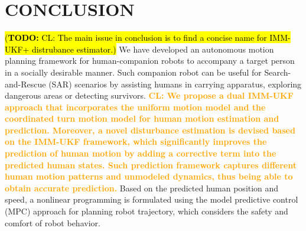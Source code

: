 \documentclass[journal]{IEEEtran}
\newcommand{\todohere}[1]{\hl{(\textbf{TODO:} #1)}}
\DeclareRobustCommand{\clnote}[1]{\ifthenelse{\boolean{include-notes}}%
	{\textcolor{orange}{\textbf{CL: #1}}}{}}
\begin{document}
	\section{CONCLUSION}\label{sec:conclusion}
	\todohere{CL: The main issue in conclusion is to find a concise name for IMM-UKF+ distrubance estimator.}
	We have developed an autonomous motion planning framework for human-companion robots to accompany a target person in a socially desirable manner.
	Such companion robot can be useful for Search-and-Rescue (SAR) scenarios by assisting humans in carrying apparatus, exploring dangerous areas or detecting survivors.
	\clnote{
		We propose a dual IMM-UKF approach that incorporates the uniform motion model and the coordinated turn motion model for human motion estimation and prediction.
		Moreover, a novel disturbance estimation is devised based on the IMM-UKF framework, which significantly improves the prediction of human motion by adding a corrective term into the predicted human states.
		Such prediction framework captures different human motion patterns and unmodeled dynamics, thus being able to obtain accurate prediction.}
	Based on the predicted human position and speed, a nonlinear programming is formulated using the model predictive control (MPC) approach for planning robot trajectory, which considers the safety and comfort of robot behavior.
	
\end{document}
